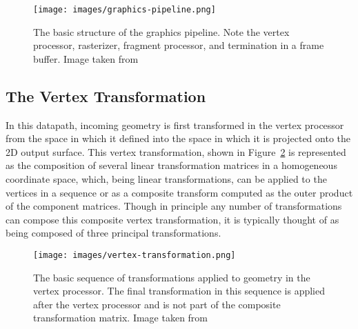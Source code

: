 \begin{figure}[ht!]
\centering
\texttt{[image: images/graphics-pipeline.png]}
\caption{The basic structure of the graphics pipeline. Note the vertex processor, rasterizer, fragment processor, and termination in a frame buffer. Image taken from  \protect\cite{pipeline-image-ref}}
\label{fig:graphics-pipeline}
\end{figure}


\subsection{The Vertex Transformation}
\label{sec:vertex-transform}
In this datapath, incoming geometry is first transformed in the vertex processor from the space in which it defined into the space in which it is projected onto the 2D output surface. This vertex transformation, shown in Figure~\ref{fig:vertex-transformation} is represented as the composition of several linear transformation matrices in a homogeneous coordinate space, which, being linear transformations, can be applied to the vertices in a sequence or as a composite transform computed as the outer product of the component matrices. Though in principle any number of transformations can compose this composite vertex transformation, it is typically thought of as being composed of three principal transformations. 

\begin{figure}[ht!]
\centering
\texttt{[image: images/vertex-transformation.png]}
\caption{The basic sequence of transformations applied to geometry in the vertex processor. The final transformation in this sequence is applied after the vertex processor and is not part of the composite transformation matrix. Image taken from  \protect\cite{transform-image-ref}}
\label{fig:vertex-transformation}
\end{figure}


